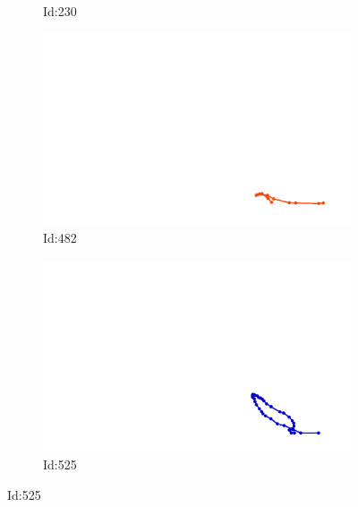 \documentclass[12pt,twoside]{report}
\begin{document}
\begin{figure}
\begin{subfigure}[b]{0.20\textwidth}
\caption{Id:230}
\end{subfigure}
\begin{subfigure}[b]{0.20\textwidth}
\centering
\includegraphics[width=\textwidth]{../../trajectories/482.png}
\caption{Id:482}
\end{subfigure}
\begin{subfigure}[b]{0.20\textwidth}
\centering
\includegraphics[width=\textwidth]{../../trajectories/525.png}
\caption{Id:525}
\end{subfigure}
\end{figure}
\end{document}
